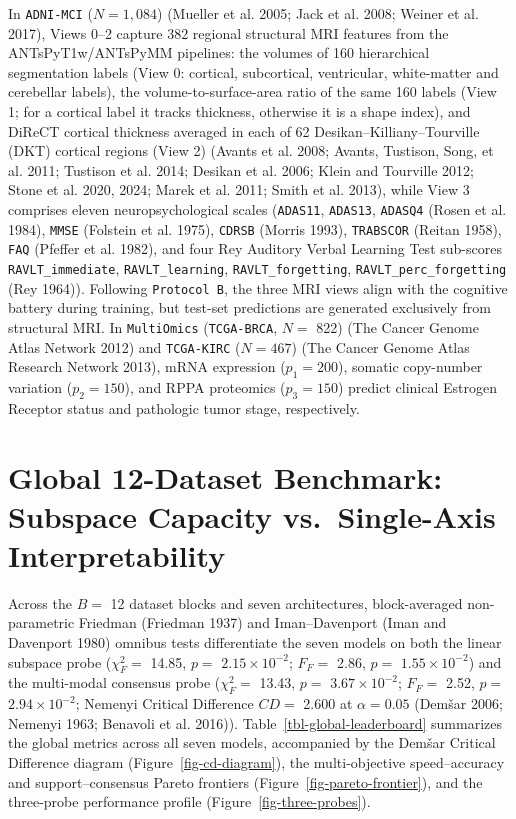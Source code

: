 \documentclass[
  10pt,
  letterpaper,
]{report}
\begin{document}
In \texttt{ADNI-MCI} (\(N = 1,084\)) (Mueller et al. 2005; {Jack et al.}
2008; {Weiner et al.} 2017), Views 0--2 capture \(382\) regional
structural MRI features from the ANTsPyT1w/ANTsPyMM pipelines: the
volumes of 160 hierarchical segmentation labels (View 0: cortical,
subcortical, ventricular, white-matter and cerebellar labels), the
volume-to-surface-area ratio of the same 160 labels (View 1; for a
cortical label it tracks thickness, otherwise it is a shape index), and
DiReCT cortical thickness averaged in each of 62
Desikan--Killiany--Tourville (DKT) cortical regions (View 2) (Avants et
al. 2008; Avants, Tustison, Song, et al. 2011; Tustison et al. 2014;
Desikan et al. 2006; Klein and Tourville 2012; {Stone et al.} 2020,
2024; {Marek et al.} 2011; {Smith et al.} 2013), while View 3 comprises
eleven neuropsychological scales (\texttt{ADAS11}, \texttt{ADAS13},
\texttt{ADASQ4} (Rosen et al. 1984), \texttt{MMSE} (Folstein et al.
1975), \texttt{CDRSB} (Morris 1993), \texttt{TRABSCOR} (Reitan 1958),
\texttt{FAQ} (Pfeffer et al. 1982), and four Rey Auditory Verbal
Learning Test sub-scores \texttt{RAVLT\_immediate},
\texttt{RAVLT\_learning}, \texttt{RAVLT\_forgetting},
\texttt{RAVLT\_perc\_forgetting} (Rey 1964)). Following
\texttt{Protocol\ B}, the three MRI views align with the cognitive
battery during training, but test-set predictions are generated
exclusively from structural MRI. In \texttt{MultiOmics}
(\texttt{TCGA-BRCA}, \(N =\) 822) (The Cancer Genome Atlas Network 2012)
and \texttt{TCGA-KIRC} (\(N = 467\)) (The Cancer Genome Atlas Research
Network 2013), mRNA expression (\(p_1 = 200\)), somatic copy-number
variation (\(p_2 = 150\)), and RPPA proteomics (\(p_3 = 150\)) predict
clinical Estrogen Receptor status and pathologic tumor stage,
respectively.

\section{Global 12-Dataset Benchmark: Subspace Capacity vs.~Single-Axis
Interpretability}\label{global-12-dataset-benchmark-subspace-capacity-vs.-single-axis-interpretability}

Across the \(B =\) 12 dataset blocks and seven architectures,
block-averaged non-parametric Friedman (Friedman 1937) and
Iman--Davenport (Iman and Davenport 1980) omnibus tests differentiate
the seven models on both the linear subspace probe (\(\chi_F^2 =\)
14.85, \(p =\) \(2.15 \times 10^{-2}\); \(F_F =\) 2.86, \(p =\)
\(1.55 \times 10^{-2}\)) and the multi-modal consensus probe
(\(\chi_F^2 =\) 13.43, \(p =\) \(3.67 \times 10^{-2}\); \(F_F =\) 2.52,
\(p =\) \(2.94 \times 10^{-2}\); Nemenyi Critical Difference \(CD =\)
2.600 at \(\alpha = 0.05\) (Demšar 2006; Nemenyi 1963; Benavoli et al.
2016)). Table~\ref{tbl-global-leaderboard} summarizes the global metrics
across all seven models, accompanied by the Demšar Critical Difference
diagram (Figure~\ref{fig-cd-diagram}), the multi-objective
speed--accuracy and support--consensus Pareto frontiers
(Figure~\ref{fig-pareto-frontier}), and the three-probe performance
profile (Figure~\ref{fig-three-probes}).
\end{document}
